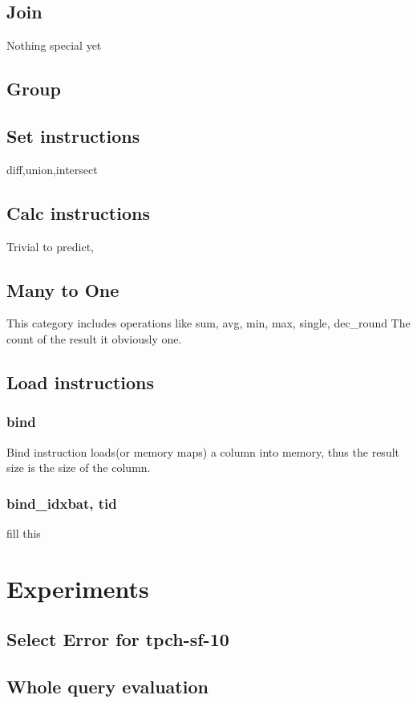 \documentclass{article}
\begin{document}
\subsection{Join}
Nothing special yet

\subsection{Group}

\subsection{Set instructions}
diff,union,intersect

\subsection{Calc instructions}
Trivial to predict,

\subsection{Many to One}
This category includes operations like sum, avg, min, max, single, dec\_round
The count of the result it obviously one.

\subsection{Load instructions}
\subsubsection{bind}
Bind instruction loads(or memory maps) a column into memory,
thus the result size is the size of the column.
\subsubsection{bind\_idxbat, tid}
fill this
\section{Experiments}
\subsection{Select Error for tpch-sf-10}

\subsection{Whole query evaluation}
\end{document}
